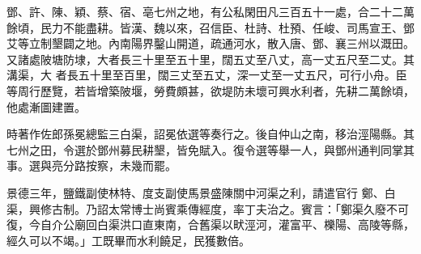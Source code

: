 \begin{pinyinscope}
 鄧、許、陳、穎、蔡、宿、亳七州之地，有公私閑田凡三百五十一處，合二十二萬餘頃，民力不能盡耕。皆漢、魏以來，召信臣、杜詩、杜預、任峻、司馬宣王、鄧艾等立制墾闢之地。內南陽界鑿山開道，疏通河水，散入唐、鄧、襄三州以溉田。又諸處陂塘防埭，大者長三十里至五十里，闊五丈至八丈，高一丈五尺至二丈。其溝渠，大
 者長五十里至百里，闊三丈至五丈，深一丈至一丈五尺，可行小舟。臣等周行歷覽，若皆增築陂堰，勞費頗甚，欲堤防未壞可興水利者，先耕二萬餘頃，他處漸圖建置。



 時著作佐郎孫冕總監三白渠，詔冕依選等奏行之。後自仲山之南，移治涇陽縣。其七州之田，令選於鄧州募民耕墾，皆免賦入。復令選等舉一人，與鄧州通判同掌其事。選與亮分路按察，未幾而罷。



 景德三年，鹽鐵副使林特、度支副使馬景盛陳關中河渠之利，請遣官行
 鄭、白渠，興修古制。乃詔太常博士尚賓乘傳經度，率丁夫治之。賓言：「鄭渠久廢不可復，今自介公廟回白渠洪口直東南，合舊渠以畎涇河，灌富平、櫟陽、高陵等縣，經久可以不竭。」工既畢而水利饒足，民獲數倍。



\end{pinyinscope}